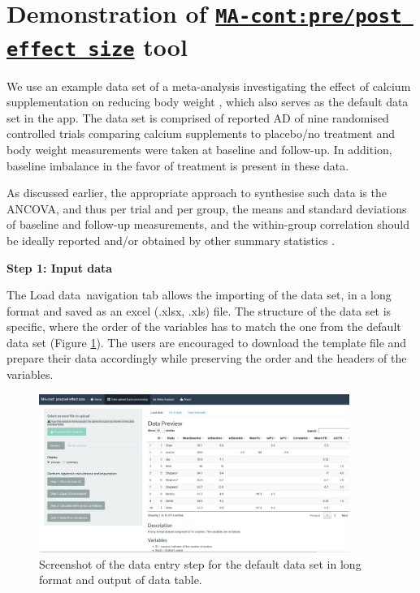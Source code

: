 \documentclass[AMA,STIX1COL]{WileyNJD-v2}
\begin{document}
\section{Demonstration of \href{https://katerina-pap.shinyapps.io/MA-cont-prepostES/}{\textbf{\texttt{MA-cont:pre/post effect size}}} tool}
\vspace{0.2cm}

We use an example data set of a meta-analysis investigating the effect of calcium supplementation on reducing body weight \citep
{trowman2006systematic}, which also serves as the default data set in the app. The data set is comprised of reported AD of nine randomised controlled trials comparing calcium supplements to placebo/no treatment and body weight measurements were taken at baseline and follow-up. In addition, baseline imbalance in the favor of treatment is present in these data.

As discussed earlier, the appropriate approach to synthesise such data is the ANCOVA, and thus per trial and per group, the means and standard deviations of baseline and follow-up measurements, and the within-group correlation should be ideally reported and/or obtained by other summary statistics \citep{higgins2011chapter}.
\vspace{0.1cm}

\textbf{Step 1: Input data}
\vspace{0.1cm}

The \textquotesingle Load data\textquotesingle\ navigation tab allows the importing of the data set, in a long format and saved as an excel (.xlsx, .xls) file. The structure of the data set is specific, where the order of the variables has to match the one from the default data set (Figure \ref{fig: shiny-input_data}). The users are encouraged to download the template file and prepare their data accordingly while preserving the order and the headers of the variables. 

\begin{figure}[t]
  \centering \includegraphics[width=0.9\textwidth]{input_data.JPG}
    \caption{\small {Screenshot of the data entry step for the default data set in long format and output of data table.}} \label{fig: shiny-input_data}
\end{figure}
\end{document}
